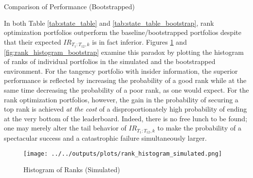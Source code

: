 \documentclass[3p,times,twocolumn]{elsarticle}
\begin{document}
\begin{table}[!htbp]
    \fontsize{5.5}{5.5}\selectfont
    \centering
    \caption{Comparison of Performance (Bootstrapped)}
    \label{tab:state_table_bootstrap}
\end{table}

In both Table \ref{tab:state_table} and \ref{tab:state_table_bootstrap}, rank optimization portfolios outperform the baseline/bootstrapped portfolios despite that their expected $IR_{T_{1}:T_{12},k}$ is in fact inferior.
Figures \ref{fig:rank_histogram} and \ref{fig:rank_histogram_bootstrap} examine this paradox by plotting the histogram of ranks of individual portfolios in the simulated and the bootstrapped environment.
For the tangency portfolio with insider information, the superior performance is reflected by increasing the probability of a good rank while at the same time decreasing the probability of a poor rank, as one would expect.
For the rank optimization portfolios, however, the gain in the probability of securing a top rank is achieved \emph{at the cost} of a disproportionately high probability of ending at the very bottom of the leaderboard.
Indeed, there is no free lunch to be found; one may merely alter the tail behavior of $IR_{T_{1}:T_{12},k}$ to make the probability of a spectacular success and a catastrophic failure simultaneously larger.

\begin{figure}[!htbp]
    \centering
    \texttt{[image: ../../outputs/plots/rank\_histogram\_simulated.png]}
    \caption{Histogram of Ranks (Simulated)}
    \label{fig:rank_histogram}
\end{figure}
\end{document}

